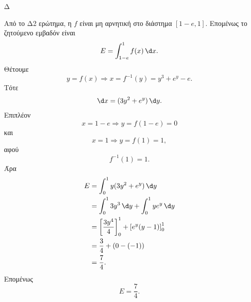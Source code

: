 \begin{thema}{Δ}
\begin{erwthma}
\item Από το Δ2 ερώτημα, η $f$ είναι μη αρνητική στο διάστημα $[1-e,1]$. Επομένως το ζητούμενο εμβαδόν είναι
\[
E=\int_{1-e}^{1}f(x)\,\d x.
\]
Θέτουμε
\[
y=f(x)\Rightarrow x=f^{-1}(y)=y^3+e^y-e.
\]
Τότε
\[
\d x=(3y^2+e^y)\,\d y.
\]
Επιπλέον
\[
x=1-e\Rightarrow y=f(1-e)=0
\]
και
\[
x=1\Rightarrow y=f(1)=1,
\]
αφού
\[
f^{-1}(1)=1.
\]
Άρα
\begin{align*}
E&=\int_0^1 y(3y^2+e^y)\,\d y\\
&=\int_0^1 3y^3\,\d y+\int_0^1 y e^y\,\d y\\
&=\left[\frac{3y^4}{4}\right]_0^1+\left[e^y(y-1)\right]_0^1\\
&=\frac{3}{4}+\left(0-(-1)\right)\\
&=\frac{7}{4}.
\end{align*}
Επομένως
\[
{E=\frac{7}{4}}.
\]
\end{erwthma}
\end{thema}
